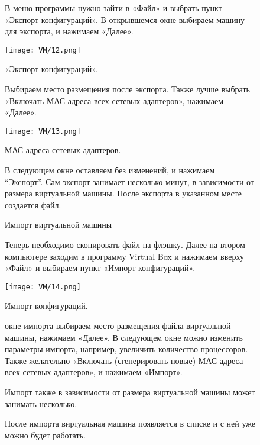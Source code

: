 \begin{figure}
\quad В меню программы нужно зайти в «Файл» и выбрать пункт «Экспорт конфигураций». В открывшемся окне выбираем машину для экспорта, и нажимаем «Далее».

		\centering
		\texttt{[image: VM/12.png]}
\caption{«Экспорт конфигураций».}
\label{ris:image}

\end{figure}

\begin{figure}
\quad Выбираем место размещения после экспорта. Также лучше выбрать «Включать МАС-адреса всех сетевых адаптеров», нажимаем «Далее».

		\centering
		\texttt{[image: VM/13.png]}
\caption{МАС-адреса сетевых адаптеров.}
\label{ris:image}

\end{figure}

\begin{figure}
\quad В следующем окне оставляем без изменений, и нажимаем “Экспорт”. Сам экспорт занимает несколько минут, в зависимости от размера виртуальной машины. После экспорта в указанном месте создается файл.
\end{figure}

\begin{figure}
\centering
Импорт виртуальной машины
\label{ris:image}
\end{figure}

\begin{figure}
\quad Теперь необходимо скопировать файл на флэшку. Далее на втором компьютере заходим в программу Virtual Box и нажимаем вверху «Файл» и выбираем пункт «Импорт конфигураций».

\centering
		\texttt{[image: VM/14.png]}
\caption{Импорт конфигураций.}
\label{ris:image}
\end{figure}

\begin{figure}
 окне импорта выбираем место размещения файла виртуальной машины, нажимаем «Далее». В следующем окне можно изменить параметры импорта, например, увеличить количество процессоров. Также желательно «Включать (сгенерировать новые) МАС-адреса всех сетевых адаптеров», и нажимаем «Импорт».
\end{figure}

\begin{figure}
\quad Импорт также в зависимости от размера виртуальной машины может занимать несколько.
\end{figure}

\begin{figure}
\quad После импорта виртуальная машина появляется в списке и с ней уже можно будет работать.
\end{figure}

